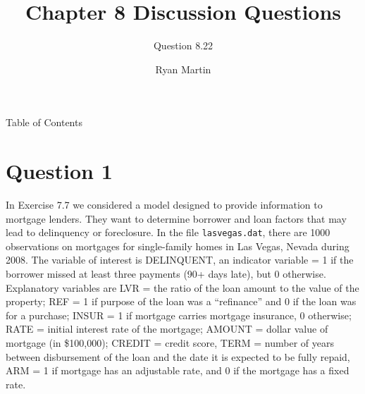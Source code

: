\documentclass[xcolor={dvipsnames}]{beamer}
\title{ Chapter 8 Discussion Questions}
\subtitle{Question 8.22}
\author{Ryan Martin}
\begin{document}
	\maketitle


	\begin{frame}{Table of Contents}
		\tableofcontents
	\end{frame}

	\section{Question 1}
	
	\begin{frame}[allowframebreaks]{8.22}
	In Exercise 7.7 we considered a model designed to provide information to mortgage lenders. They want to determine borrower and loan factors that may lead to delinquency or foreclosure. In the file \texttt{lasvegas.dat}, there are 1000 observations on mortgages for single-family homes in Las Vegas, Nevada during 2008. The variable of interest is DELINQUENT, an indicator variable = 1 if the borrower missed at least three payments (90+ days late), but 0 otherwise. Explanatory variables are LVR = the ratio of the loan amount to the value of the property; REF = 1 if purpose of the loan was a ``refinance'' and 0 if the loan was for a purchase; INSUR = 1 if mortgage carries mortgage insurance, 0 otherwise; RATE = initial interest rate of the mortgage; AMOUNT = dollar value of mortgage (in \$100,000); CREDIT = credit score, TERM = number of years between disbursement of the loan and the date it is expected to be fully repaid, ARM = 1 if mortgage has an adjustable rate, and 0 if the mortgage has a fixed rate.
	

\end{frame}
\end{document}
